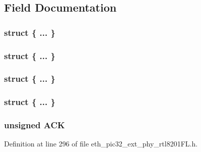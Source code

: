\subsection{Field Documentation}
\hypertarget{union_____a_n_l_p_r_n_pbits__t_a03ec5bae63d80958078b5dd0266f990a}{}\subsubsection[{"@136}]{\setlength{\rightskip}{0pt plus 5cm}struct \{ ... \} }\label{union_____a_n_l_p_r_n_pbits__t_a03ec5bae63d80958078b5dd0266f990a}
\hypertarget{union_____a_n_l_p_r_n_pbits__t_a1e4e65211b676052b052bc62974a31b7}{}\subsubsection[{"@138}]{\setlength{\rightskip}{0pt plus 5cm}struct \{ ... \} }\label{union_____a_n_l_p_r_n_pbits__t_a1e4e65211b676052b052bc62974a31b7}
\hypertarget{union_____a_n_l_p_r_n_pbits__t_a9cdb12d55f02fe3a75de3d924849ea00}{}\subsubsection[{"@208}]{\setlength{\rightskip}{0pt plus 5cm}struct \{ ... \} }\label{union_____a_n_l_p_r_n_pbits__t_a9cdb12d55f02fe3a75de3d924849ea00}
\hypertarget{union_____a_n_l_p_r_n_pbits__t_ae1ecba0a9958d7760428084f7e75e749}{}\subsubsection[{"@210}]{\setlength{\rightskip}{0pt plus 5cm}struct \{ ... \} }\label{union_____a_n_l_p_r_n_pbits__t_ae1ecba0a9958d7760428084f7e75e749}
\hypertarget{union_____a_n_l_p_r_n_pbits__t_a9d5913829bb2b681dc6257fc7e9b7a56}{}
\subsubsection[{A\+C\+K}]{\setlength{\rightskip}{0pt plus 5cm}unsigned A\+C\+K}\label{union_____a_n_l_p_r_n_pbits__t_a9d5913829bb2b681dc6257fc7e9b7a56}


Definition at line 296 of file eth\+\_\+pic32\+\_\+ext\+\_\+phy\+\_\+rtl8201\+F\+L.\+h.

\hypertarget{union_____a_n_l_p_r_n_pbits__t_a04eefaff71d440a3996c7db3676475ba}{}
